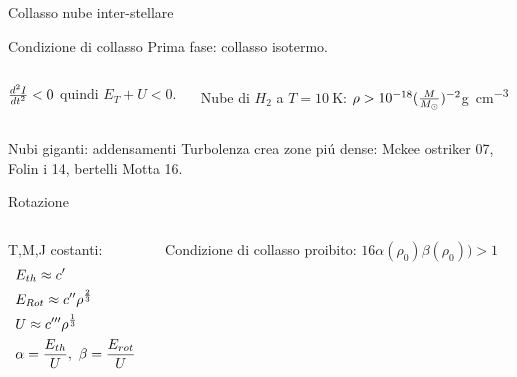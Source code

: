 \begin{frame}{Collasso nube inter-stellare}

\begin{block}{Condizione di collasso}
Prima fase: collasso isotermo.
\begin{columns}
\begin{column}{0.5\textwidth}
$\TtwoDy{t}{I}<0$ quindi $E_T+U<0$.
\end{column}
\begin{column}{0.5\textwidth}
Nube di $H_2$ a $T=\SI{10}{\kelvin}$:
$\rho>\num{e-18}(\frac{M}{\msun{}})^{-2}$\si{\gram\per\cubic\cm}
\end{column}
\end{columns}
\end{block}
\begin{block}{Nubi giganti: addensamenti}
Turbolenza crea zone pi\'u dense: Mckee ostriker 07, Folin i 14, bertelli Motta 16.
\end{block}
\begin{block}{Rotazione}
\begin{columns}[T]
\begin{column}{0.5\textwidth}
T,M,J costanti:
\begin{align*}
&E_{th}\approx c'\\
&E_{Rot}\approx c''\rho\expy{\frac{2}{3}}\\
&U\approx c'''\rho\expy{\frac{1}{3}}\\
&\alpha=\frac{E_{th}}{U},\ \beta=\frac{E_{rot}}{U}
\end{align*}
\end{column}
\begin{column}{0.5\textwidth}
Condizione di collasso proibito: $16\alpha(\rho_0)\beta(\rho_0))>1$
\end{column}
\end{columns}
\end{block}
\end{frame}

